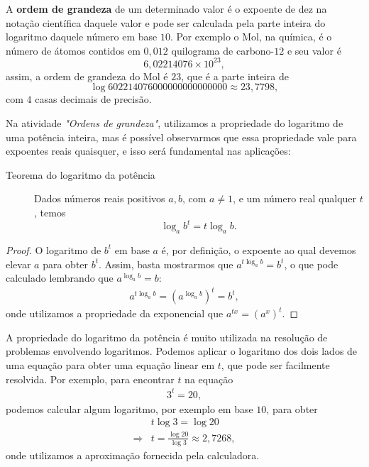 \begin{knowledge}
A \textbf{ordem de grandeza} de um determinado valor é o expoente de dez na notação científica daquele valor e pode ser calculada pela parte inteira do logaritmo daquele número em base $10$. Por exemplo o Mol, na química, é o número de átomos contidos em $0{,}012$ quilograma de carbono-$12$ e seu valor é
$$
6{,}02214076 \times 10^{23},
$$
assim, a ordem de grandeza do Mol é $23$, que é a parte inteira de $$\log 602214076000000000000000 \approx 23{,}7798,$$ com $4$ casas decimais de precisão.
\end{knowledge}

Na atividade \textit{"Ordens de grandeza"}, utilizamos a propriedade do logaritmo de uma potência inteira, mas é possível observarmos que essa propriedade vale para expoentes reais quaisquer, e isso será fundamental nas aplicações:

 
\begin{description}
\item[Teorema do logaritmo da potência]\label{teo_log_pot} 
Dados números reais positivos $a,b$, com $a \neq 1$, e um número real qualquer $t$, temos
$$
\log_a b^t = t\log_a b.
$$
\end{description}
\begin{proof}
O logaritmo de $b^t$ em base $a$ é, por definição, o expoente ao qual devemos elevar $a$ para obter $b^t$. Assim, basta mostrarmos que $a^{t\log_a b} =b^t$, o que pode calculado lembrando que $a^{\log_a b}=b$:
\begin{align*}
a^{t\log_a b} = (a^{\log_a b})^t = b^t,
\end{align*}
onde utilizamos a propriedade da exponencial que $a^{tx} = (a^{x})^t$.
\end{proof}

\begin{observation}
A propriedade do logaritmo da potência é muito utilizada na resolução de problemas envolvendo logaritmos. Podemos aplicar o logaritmo dos dois lados de uma equação para obter uma equação linear em $t$, que pode ser facilmente resolvida. Por exemplo, para encontrar $t$ na equação
\begin{align*}
3^t=20,
\end{align*}
podemos calcular algum logaritmo, por exemplo em base $10$, para obter
\begin{align*}
&t\log 3=\log 20\\
\Longrightarrow &t = \frac{\log 20}{\log 3} \approx 2{,}7268,
\end{align*}
onde utilizamos a aproximação fornecida pela calculadora.
\end{observation}

